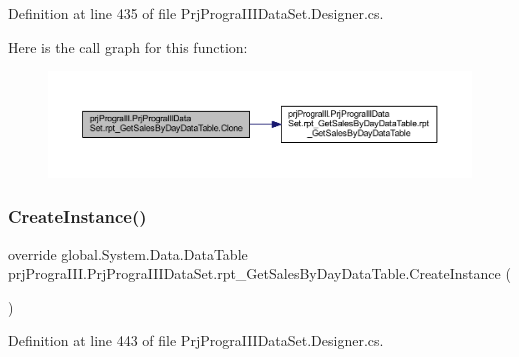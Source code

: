 Definition at line 435 of file Prj\+Progra\+I\+I\+I\+Data\+Set.\+Designer.\+cs.

Here is the call graph for this function\+:
\nopagebreak
\begin{figure}[H]
\begin{center}
\leavevmode
\includegraphics[width=350pt]{classprj_progra_i_i_i_1_1_prj_progra_i_i_i_data_set_1_1rpt___get_sales_by_day_data_table_aeb9181a316dd54a548607a9cd8fbc16c_cgraph}
\end{center}
\end{figure}
\hypertarget{classprj_progra_i_i_i_1_1_prj_progra_i_i_i_data_set_1_1rpt___get_sales_by_day_data_table_a6c1dc206c680402843dbbe9744a240ed}{}\label{classprj_progra_i_i_i_1_1_prj_progra_i_i_i_data_set_1_1rpt___get_sales_by_day_data_table_a6c1dc206c680402843dbbe9744a240ed} 
\subsubsection{\texorpdfstring{Create\+Instance()}{CreateInstance()}}
{\footnotesize\ttfamily override global.\+System.\+Data.\+Data\+Table prj\+Progra\+I\+I\+I.\+Prj\+Progra\+I\+I\+I\+Data\+Set.\+rpt\+\_\+\+Get\+Sales\+By\+Day\+Data\+Table.\+Create\+Instance (\begin{DoxyParamCaption}{ }\end{DoxyParamCaption})\hspace{0.3cm}{\ttfamily [protected]}}



Definition at line 443 of file Prj\+Progra\+I\+I\+I\+Data\+Set.\+Designer.\+cs.

